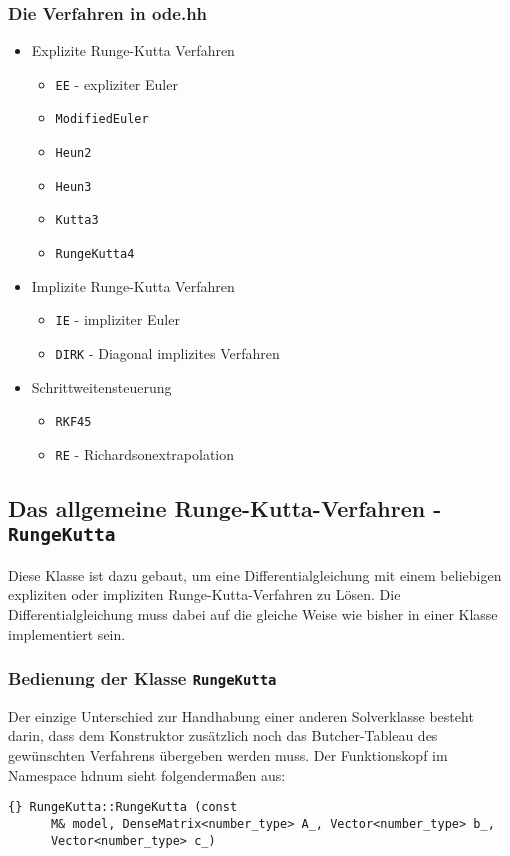 \documentclass[a4paper,11pt]{article}
\theoremstyle{definition}
\begin{document}
\subsubsection{Die Verfahren in ode.hh}
\begin{itemize}
\item Explizite Runge-Kutta Verfahren
  \begin{itemize}
  \item\lstinline{EE} - expliziter Euler
  \item\lstinline{ModifiedEuler}
  \item\lstinline{Heun2}
  \item\lstinline{Heun3}
  \item\lstinline{Kutta3}
  \item\lstinline{RungeKutta4}
  \end{itemize}
\item Implizite Runge-Kutta Verfahren
  \begin{itemize}
  \item \lstinline{IE} - impliziter Euler
  \item \lstinline{DIRK} - Diagonal implizites Verfahren
  \end{itemize}
\item Schrittweitensteuerung
  \begin{itemize}
  \item\lstinline{RKF45}
  \item\lstinline{RE} - Richardsonextrapolation
  \end{itemize}
\end{itemize}

\subsection{Das allgemeine Runge-Kutta-Verfahren - \lstinline{RungeKutta}}
Diese Klasse ist dazu gebaut, um eine Differentialgleichung mit einem
beliebigen expliziten oder impliziten Runge-Kutta-Verfahren zu
Lösen. Die Differentialgleichung muss dabei auf die gleiche Weise wie
bisher in einer Klasse implementiert sein.

\subsubsection{Bedienung der Klasse \lstinline{RungeKutta}}
Der einzige Unterschied zur Handhabung einer anderen Solverklasse
besteht darin, dass dem Konstruktor zusätzlich noch das
Butcher-Tableau des gewünschten Verfahrens übergeben werden muss. Der
Funktionskopf im Namespace hdnum sieht folgendermaßen aus:
{\footnotesize{\begin{lstlisting}{} RungeKutta::RungeKutta (const
      M& model, DenseMatrix<number_type> A_, Vector<number_type> b_,
      Vector<number_type> c_)
\end{lstlisting}}}
\end{document}

